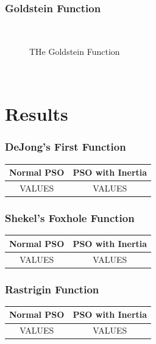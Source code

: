 \subsubsection{Goldstein Function}
~
~
\begin{figure}[ht]
	\centering
	\setlength \fboxsep{0pt}
	\setlength \fboxrule{0.5pt}
	\caption{THe Goldstein Function}
	\label{fig:GoldsteinGraph}
\end{figure}
~

\section{Results}
\subsubsection{DeJong's First Function}
\begin{center}
	\begin{tabular}{| c | c |}
	\hline
	Normal PSO & PSO with Inertia \\  \hline
	VALUES & VALUES \\ \hline
	\hline
	\end{tabular}
\end{center}
\subsubsection{Shekel's Foxhole Function}
\begin{center}
	\begin{tabular}{| c | c |}
	\hline
	Normal PSO & PSO with Inertia \\  \hline
	VALUES & VALUES \\ \hline
	\end{tabular}
\end{center}
\subsubsection{Rastrigin Function}
\begin{center}
	\begin{tabular}{| c | c |}
	\hline
	Normal PSO & PSO with Inertia \\  \hline
	VALUES & VALUES \\ \hline
	\end{tabular}
\end{center}
